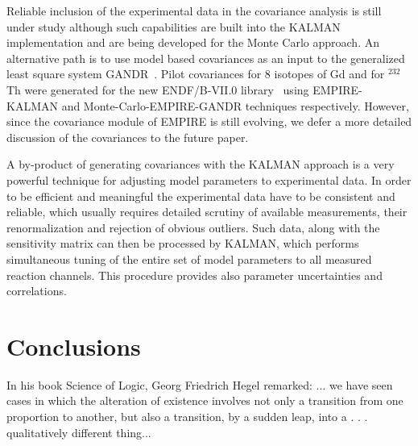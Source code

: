 \documentclass[twocolumn,amsmath,amssymb,10pt,groupedaddress,a4paper]{revtex4}
\begin{document}
Reliable inclusion of the experimental data in the covariance analysis is still under study although such capabilities are built into the KALMAN implementation and are being developed for the Monte Carlo approach.
An alternative path is to use model based covariances as an input to the generalized least square system GANDR~\cite{GANDR}. Pilot covariances for 8 isotopes of Gd and for $^{232}$Th were generated for the new ENDF/B-VII.0 library~\cite{ENDF-VII} using EMPIRE-KALMAN and Monte-Carlo-EMPIRE-GANDR techniques respectively. However, since the covariance module of EMPIRE is still evolving, we defer a more detailed discussion of the covariances to the future paper.

A by-product of generating covariances with the KALMAN approach is a very powerful technique for adjusting model parameters to experimental data. In order to be efficient and meaningful the experimental data have to be consistent and reliable, which usually requires detailed scrutiny of available measurements, their renormalization and rejection of obvious outliers. Such data, along with the sensitivity matrix can then be processed by KALMAN, which performs simultaneous tuning of the entire set of model parameters to all measured reaction channels. This procedure provides also parameter uncertainties and correlations.


\section{Conclusions}

In his book Science of Logic, Georg Friedrich Hegel remarked:
... we have seen cases in which the alteration of existence
involves not only a transition from one proportion to another,
but also a transition, by a sudden leap, into a . . . qualitatively
different thing...%
\end{document}
